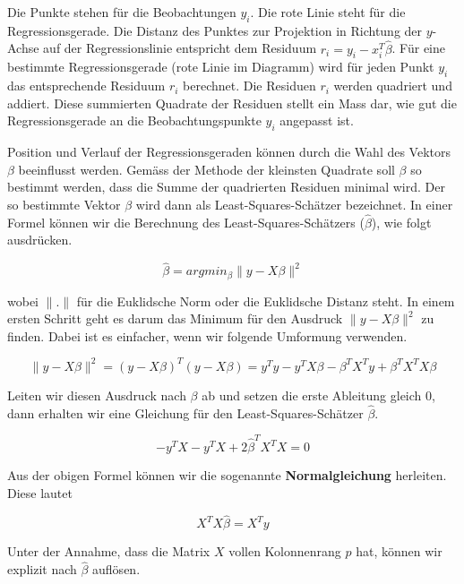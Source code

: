 \documentclass[]{book}
\begin{document}
Die Punkte stehen für die Beobachtungen \(y_i\). Die rote Linie steht
für die Regressionsgerade. Die Distanz des Punktes zur Projektion in
Richtung der \(y\)-Achse auf der Regressionslinie entspricht dem
Residuum \(r_i = y_i - x_i^T \hat{\beta}\). Für eine bestimmte
Regressionsgerade (rote Linie im Diagramm) wird für jeden Punkt \(y_i\)
das entsprechende Residuum \(r_i\) berechnet. Die Residuen \(r_i\)
werden quadriert und addiert. Diese summierten Quadrate der Residuen
stellt ein Mass dar, wie gut die Regressionsgerade an die
Beobachtungspunkte \(y_i\) angepasst ist.

Position und Verlauf der Regressionsgeraden können durch die Wahl des
Vektors \(\beta\) beeinflusst werden. Gemäss der Methode der kleinsten
Quadrate soll \(\beta\) so bestimmt werden, dass die Summe der
quadrierten Residuen minimal wird. Der so bestimmte Vektor \(\beta\)
wird dann als Least-Squares-Schätzer bezeichnet. In einer Formel können
wir die Berechnung des Least-Squares-Schätzers (\(\hat{\beta}\)), wie
folgt ausdrücken.

\begin{equation}\hat{\beta} = argmin_{\beta} \| y - X\beta \| ^2\end{equation}

wobei \(\| .\|\) für die Euklidsche Norm oder die Euklidsche Distanz
steht. In einem ersten Schritt geht es darum das Minimum für den
Ausdruck \(\| y - X\beta \| ^2\) zu finden. Dabei ist es einfacher, wenn
wir folgende Umformung verwenden.

\begin{equation}\| y - X\beta \| ^2 = (y - X\beta)^T(y - X\beta) = y^Ty - y^TX\beta - \beta^TX^Ty + \beta^TX^TX\beta\end{equation}

Leiten wir diesen Ausdruck nach \(\beta\) ab und setzen die erste
Ableitung gleich \(0\), dann erhalten wir eine Gleichung für den
Least-Squares-Schätzer \(\hat{\beta}\).

\begin{equation}-y^TX - y^TX + 2\hat{\beta}^TX^TX = 0\end{equation}

Aus der obigen Formel können wir die sogenannte \textbf{Normalgleichung}
herleiten. Diese lautet

\begin{equation}X^TX\hat{\beta} = X^Ty\end{equation}

Unter der Annahme, dass die Matrix \(X\) vollen Kolonnenrang \(p\) hat,
können wir explizit nach \(\hat{\beta}\) auflösen.
\end{document}
